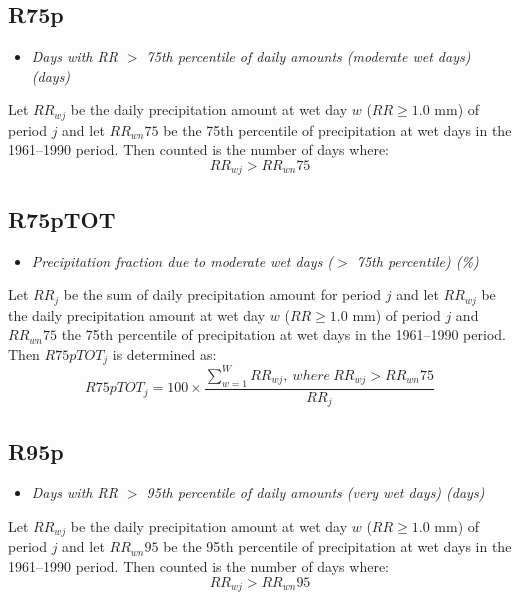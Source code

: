 \documentclass[a4paper,11pt]{article}
\begin{document}
\subsection*{R75p}
\begin{itemize}
\item \textit{Days with RR $>$ 75th percentile of daily amounts
(moderate wet days) (days)}
\end{itemize}
Let $RR_{wj}$ be the daily precipitation amount at wet day $w$
($RR\geq1.0$ mm) of period $j$ and let $RR_{wn}75$ be the 75th
percentile of precipitation at wet days in the 1961--1990 period. Then
counted is the number of days where:
\begin{equation*}
RR_{wj} > RR_{wn}75
\end{equation*}

\subsection*{R75pTOT}
\begin{itemize}
\item \textit{Precipitation fraction due to moderate wet days ($>$
75th percentile) (\%)}
\end{itemize}
Let $RR_{j}$ be the sum of daily precipitation amount for period $j$
and let $RR_{wj}$ be the daily precipitation amount at wet day $w$
($RR\geq1.0$ mm) of period $j$ and $RR_{wn}75$ the 75th percentile of
precipitation at wet days in the 1961--1990 period. Then $R75pTOT_{j}$
is determined as:
\begin{equation*}
R75pTOT_{j} = 100 \times \frac{\sum_{w=1}^{W}RR_{wj},\:where\:
RR_{wj}>RR_{wn}75}{RR_{j}}
\end{equation*}

\subsection*{R95p}
\begin{itemize}
\item \textit{Days with RR $>$ 95th percentile of daily amounts
(very wet days) (days)}
\end{itemize}
Let $RR_{wj}$ be the daily precipitation amount at wet day $w$
($RR\geq1.0$ mm) of period $j$ and let $RR_{wn}95$ be the 95th
percentile of precipitation at wet days in the 1961--1990 period. Then
counted is the number of days where:
\begin{equation*}
RR_{wj} > RR_{wn}95
\end{equation*}
\end{document}
